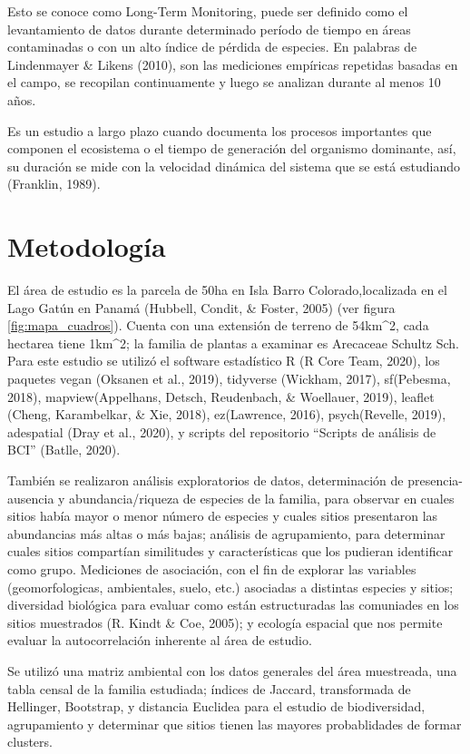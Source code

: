 \documentclass[11pt,]{article}
\begin{document}
Esto se conoce como Long-Term Monitoring, puede ser definido como el
levantamiento de datos durante determinado período de tiempo en áreas
contaminadas o con un alto índice de pérdida de especies. En palabras de
Lindenmayer \& Likens (2010), son las mediciones empíricas repetidas
basadas en el campo, se recopilan continuamente y luego se analizan
durante al menos 10 años.

Es un estudio a largo plazo cuando documenta los procesos importantes
que componen el ecosistema o el tiempo de generación del organismo
dominante, así, su duración se mide con la velocidad dinámica del
sistema que se está estudiando (Franklin, 1989).

\section{Metodología}\label{metodologuxeda}

El área de estudio es la parcela de 50ha en Isla Barro
Colorado,localizada en el Lago Gatún en Panamá (Hubbell, Condit, \&
Foster, 2005) (ver figura \ref{fig:mapa_cuadros}). Cuenta con una
extensión de terreno de 54km\^{}2, cada hectarea tiene 1km\^{}2; la
familia de plantas a examinar es Arecaceae Schultz Sch. Para este
estudio se utilizó el software estadístico R (R Core Team, 2020), los
paquetes vegan (Oksanen et al., 2019), tidyverse (Wickham, 2017),
sf(Pebesma, 2018), mapview(Appelhans, Detsch, Reudenbach, \& Woellauer,
2019), leaflet (Cheng, Karambelkar, \& Xie, 2018), ez(Lawrence, 2016),
psych(Revelle, 2019), adespatial (Dray et al., 2020), y scripts del
repositorio ``Scripts de análisis de BCI'' (Batlle, 2020).

También se realizaron análisis exploratorios de datos, determinación de
presencia-ausencia y abundancia/riqueza de especies de la familia, para
observar en cuales sitios había mayor o menor número de especies y
cuales sitios presentaron las abundancias más altas o más bajas;
análisis de agrupamiento, para determinar cuales sitios compartían
similitudes y características que los pudieran identificar como grupo.
Mediciones de asociación, con el fin de explorar las variables
(geomorfologicas, ambientales, suelo, etc.) asociadas a distintas
especies y sitios; diversidad biológica para evaluar como están
estructuradas las comuniades en los sitios muestrados (R. Kindt \& Coe,
2005); y ecología espacial que nos permite evaluar la autocorrelación
inherente al área de estudio.

Se utilizó una matriz ambiental con los datos generales del área
muestreada, una tabla censal de la familia estudiada; índices de
Jaccard, transformada de Hellinger, Bootstrap, y distancia Euclidea para
el estudio de biodiversidad, agrupamiento y determinar que sitios tienen
las mayores probablidades de formar clusters.
\end{document}
